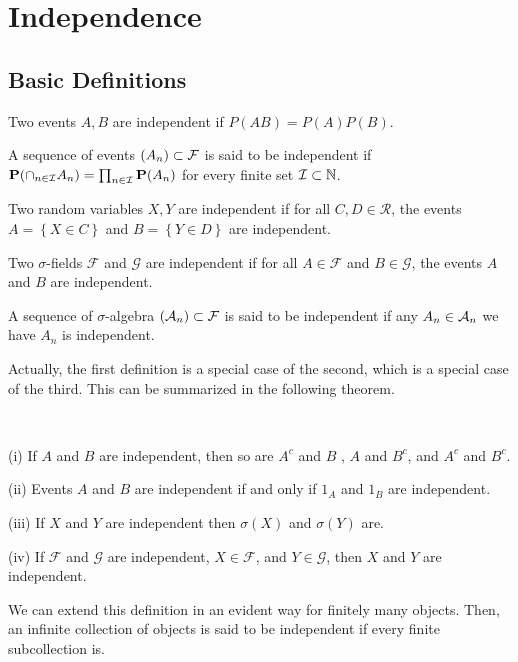 \chapter{Independence}
\section{Basic Definitions}
\begin{definition}
Two events $A,B$ are independent if $P(AB)=P(A)P(B)$.
\end{definition}
\begin{remark}
    A sequence of events $(A_n)\subset\mathcal{F}$ is said to be independent if $\mathbf{P}(\cap_{n\in\mathcal{I}}A_n)=\prod_{n\in\mathcal{I}}\mathbf{P}(A_n)$ for every finite set $\mathcal{I}\subset\mathbb{N}$.
\end{remark}

\begin{definition}
Two random variables $X,Y$ are independent if for all $C,D\in \mathcal{R}$, the events $A=\left \{ X\in C \right \} $ and $B=\left \{ Y\in D \right \} $ are independent.
\end{definition}

\begin{definition}
Two $\sigma$-fields $\mathcal{F}$ and $\mathcal{G}$ are independent if for all $A\in\mathcal{F}$ and $B\in\mathcal{G}$, the events $A$ and $B$ are independent.
\end{definition}
\begin{remark}
    A sequence of $\sigma$-algebra $(\mathcal{A}_n)\subset\mathcal{F}$ is said to be independent if any $A_n\in\mathcal{A}_n$ we have $A_n$ is independent.
\end{remark}

Actually, the first definition is a special case of the second, which is a special case of the third. This can be summarized in the following theorem.
\begin{theorem}
\,\par
(i) If $A$ and $B$ are independent, then so are $A^c$ and $B$ , $A$ and $B^c$, and $A^c$ and $B^c$.\par
(ii) Events $A$ and $B$ are independent if and only if $1_A$ and $1_B$ are independent.\par
(iii) If $X$ and $Y$ are independent then $\sigma(X)$ and $\sigma(Y)$ are.\par
(iv) If $\mathcal{F}$ and $\mathcal{G}$ are independent, $X\in\mathcal{F}$, and $Y\in\mathcal{G}$, then $X$ and $Y$ are independent.
\end{theorem}
We can extend this definition in an evident way for finitely many objects. Then, an infinite collection of objects is said to be independent if every finite subcollection is.
